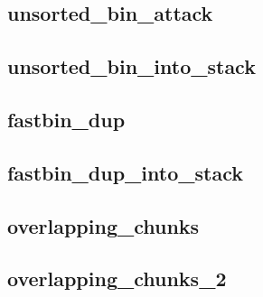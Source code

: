 \subsection{unsorted\_bin\_attack}

\subsection{unsorted\_bin\_into\_stack}

\subsection{fastbin\_dup}

\subsection{fastbin\_dup\_into\_stack}

\subsection{overlapping\_chunks}

\subsection{overlapping\_chunks\_2}

\newpage
